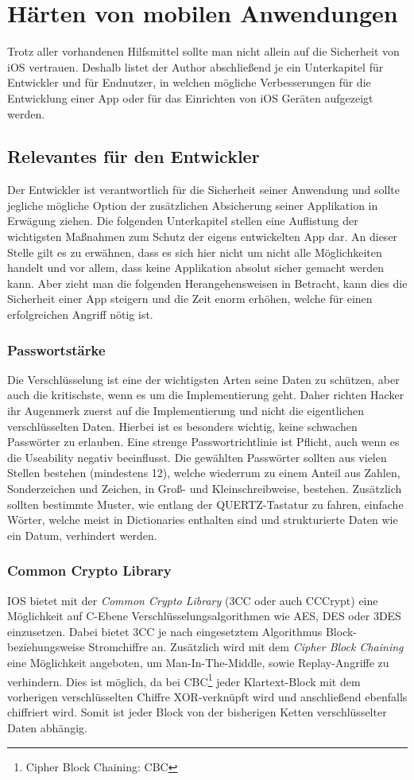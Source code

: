 \section{Härten von mobilen Anwendungen}
	Trotz aller vorhandenen Hilfsmittel sollte man nicht allein auf die Sicherheit
	von iOS vertrauen. Deshalb listet der Author abschließend je ein Unterkapitel
	für Entwickler und für Endnutzer, in welchen mögliche Verbesserungen für die
	Entwicklung einer App oder für das Einrichten von iOS Geräten aufgezeigt
	werden.
	\subsection{Relevantes für den Entwickler}
		Der Entwickler ist verantwortlich für die Sicherheit seiner Anwendung und
		sollte jegliche mögliche Option der zusätzlichen Absicherung seiner
		Applikation in Erwägung ziehen. Die folgenden Unterkapitel stellen eine
		Auflistung der wichtigsten Maßnahmen zum Schutz der eigens entwickelten App
		dar. An dieser Stelle gilt es zu erwähnen, dass es sich hier nicht um nicht
		alle Möglichkeiten handelt und vor allem, dass keine Applikation absolut
		sicher gemacht werden kann. Aber zieht man die folgenden Herangehensweisen in
		Betracht, kann dies die Sicherheit einer App steigern und die
		Zeit enorm erhöhen, welche für einen erfolgreichen Angriff nötig ist.
		\subsubsection{Passwortstärke}
			Die Verschlüsselung ist eine der wichtigsten Arten seine Daten zu schützen,
			aber auch die kritischste, wenn es um die Implementierung geht. Daher richten
			Hacker ihr Augenmerk zuerst auf die Implementierung und nicht die
			eigentlichen verschlüsselten Daten. Hierbei ist es besonders wichtig, keine
			schwachen Passwörter zu erlauben. Eine strenge Passwortrichtlinie ist
			Pflicht, auch wenn es die Useability negativ beeinflusst. Die gewählten
			Passwörter sollten aus vielen Stellen bestehen (mindestens 12),
			welche wiederrum zu einem Anteil aus Zahlen, Sonderzeichen und Zeichen, in
			Groß- und Kleinschreibweise, bestehen. Zusätzlich sollten bestimmte Muster,
			wie entlang der QUERTZ-Tastatur zu fahren, einfache Wörter, welche meist in
			Dictionaries enthalten sind und strukturierte Daten wie ein Datum, verhindert
			werden.
		\subsubsection{Common Crypto Library}\label{sec:3cc}
			IOS bietet mit der \textsl{Common Crypto Library}\cite{3CC2007}
			(3CC oder auch CCCrypt) eine Möglichkeit auf C-Ebene 
			Verschlüsselungsalgorithmen wie AES, DES oder 3DES einzusetzen. Dabei bietet
			3CC je nach eingesetztem Algorithmus Block- beziehungsweise Stromchiffre an.
			Zusätzlich wird mit dem \textsl{Cipher Block Chaining} eine
			Möglichkeit angeboten, um Man-In-The-Middle, sowie Replay-Angriffe zu
			verhindern. Dies ist möglich, da bei CBC\footnote{Cipher Block Chaining: CBC}
			jeder Klartext-Block mit dem vorherigen verschlüsselten Chiffre XOR-verknüpft wird und anschließend
			ebenfalls chiffriert wird. Somit ist jeder Block von der bisherigen Ketten
			verschlüsselter Daten abhängig.
